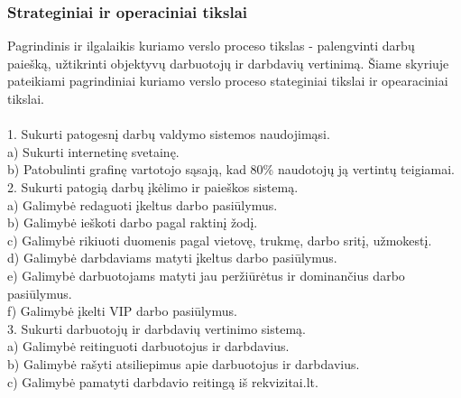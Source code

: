 \documentclass{VUMIFPSkursinis}
\begin{document}
\subsubsection{Strateginiai ir operaciniai tikslai}
Pagrindinis ir ilgalaikis kuriamo verslo proceso tikslas - palengvinti darbų paiešką, užtikrinti objektyvų darbuotojų ir darbdavių vertinimą. Šiame skyriuje pateikiami pagrindiniai kuriamo verslo proceso stateginiai tikslai ir opearaciniai tikslai.\\ \\
\hspace*{1cm}1. Sukurti patogesnį darbų valdymo sistemos naudojimąsi.\\
\hspace*{2cm} a) Sukurti internetinę svetainę.\\
\hspace*{2cm} b) Patobulinti grafinę vartotojo sąsają, kad 80\% naudotojų ją vertintų teigiamai.\\ \newline
\hspace*{1cm}2. Sukurti patogią darbų įkėlimo ir paieškos sistemą.\\
\hspace*{2cm} a) Galimybė redaguoti įkeltus darbo pasiūlymus.\\
\hspace*{2cm} b) Galimybė ieškoti darbo pagal raktinį žodį.\\
\hspace*{2cm} c) Galimybė rikiuoti duomenis pagal vietovę, trukmę, darbo sritį, užmokestį.\\
\hspace*{2cm} d) Galimybė darbdaviams matyti įkeltus darbo pasiūlymus.\\
\hspace*{2cm} e) Galimybė darbuotojams matyti jau peržiūrėtus ir dominančius darbo pasiūlymus.\\
\hspace*{2cm} f) Galimybė įkelti VIP darbo pasiūlymus.\\
\hspace*{1cm}3. Sukurti darbuotojų ir darbdavių vertinimo sistemą.\\
\hspace*{2cm} a) Galimybė reitinguoti darbuotojus ir darbdavius.\\
\hspace*{2cm} b) Galimybė rašyti atsiliepimus apie darbuotojus ir darbdavius.\\
\hspace*{2cm} c) Galimybė pamatyti darbdavio reitingą iš rekvizitai.lt.\\
\end{document}
